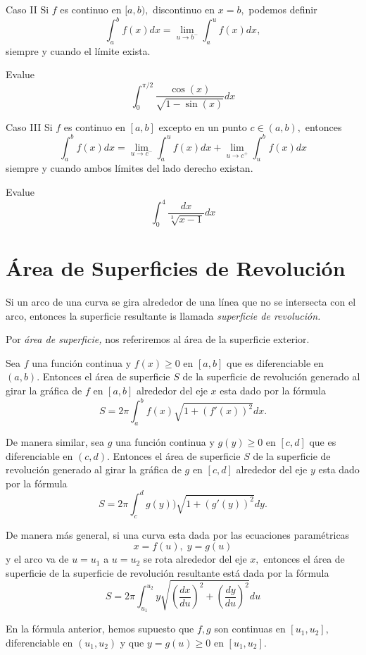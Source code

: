 {Caso II}
Si $f$ es continuo en $[a,b),$ discontinuo en $x=b,$ podemos definir
$$
\displaystyle \int_{a}^{b}f(x)dx=\lim_{u\to b^{-}} \int_{a}^{u}f(x)dx,
$$ siempre y cuando el l\'imite exista.


\begin{resuelto}
 Evalue
 $$\displaystyle \int_{0}^{\pi/2}\dfrac{\cos(x)}{\sqrt{1-\sin(x)}} dx$$
\end{resuelto}



{Caso III}
Si $f$ es continuo en $[a,b]$ excepto en un punto $c\in(a,b),$ entonces
$$
\int_{a}^{b}f(x)dx =
\lim_{u \to c^{-}} \int_{a}^{u}f(x)dx+
\lim_{u \to c^{+}} \int_{u}^{b}f(x)dx
$$
siempre y cuando ambos l\'imites del lado derecho existan.


\begin{resuelto}
 Evalue
$$\displaystyle \int_{0}^{4}\dfrac{dx}{\sqrt[3]{x-1}} dx$$
\end{resuelto}


\section{Área de Superficies de Revoluci\'on}


Si un arco de una curva se gira alrededor de una l\'inea que no se intersecta con el arco, entonces la superficie resultante is llamada \emph{superficie de revoluci\'on.}

Por \emph{área de superficie,} nos referiremos al área de la superficie exterior.




Sea $f$ una funci\'on continua y $f(x)\geq 0$  en $[a,b]$ que es diferenciable en $(a,b).$  Entonces el área de superficie $S$ de la superficie de revoluci\'on  generado al girar la gráfica de $f$ en $[a,b]$ alrededor del eje $x$ esta dado por la f\'ormula
\[
 \label{36.1}
 S=2\pi \int_{a}^{b}f(x)\sqrt{1+(f'(x))^{2}}dx.
\]





De manera similar, sea $g$ una funci\'on continua y $g(y) \geq 0$  en $[c,d]$ que es diferenciable en $(c,d).$  Entonces el área de superficie $S$ de la superficie de revoluci\'on  generado al girar la gráfica de $g$ en $[c,d]$ alrededor del eje $y$ esta dado por la f\'ormula
\[
 \label{36.2}
 S=2\pi \int_{c}^{d}g(y))\sqrt{1+(g'(y))^{2}}dy.
\]




De manera más general, si una curva esta dada por las ecuaciones param\'etricas
$$
x=f(u), \; y=g(u)
$$ y el arco va de $u=u_{1}$ a $u=u_{2}$ se rota alrededor del eje $x,$ entonces el área de superficie de la superficie de revoluci\'on resultante está dada por la f\'ormula
\[
 \label{36.3}
 S=2\pi\int_{u_{1}}^{u_{2}}y\sqrt{\left( \dfrac{dx}{du} \right)^{2}+\left( \dfrac{dy}{du} \right)^{2}}du
\]


En la f\'ormula anterior, hemos supuesto que $f,g$ son continuas en $[u_{1},u_{2}],$ diferenciable en $\left( u_{1},u_{2} \right)$ y que $y=g(u)\geq 0$ en $[u_{1},u_{2}].$
